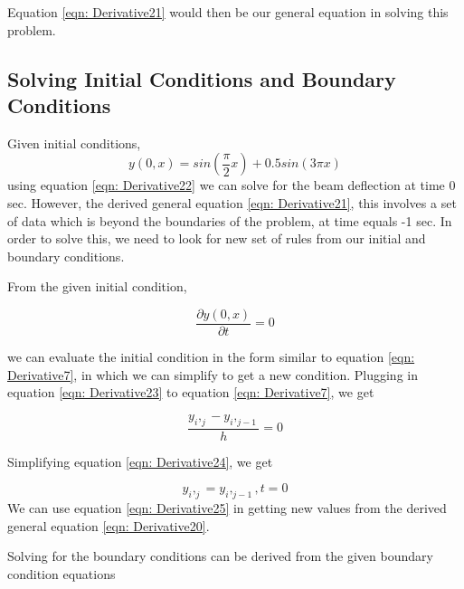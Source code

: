 \documentclass[conference]{IEEEtran}
\begin{document}
	Equation \eqref{eqn: Derivative21} would then be our general equation in solving this problem.
	
	\subsection{Solving Initial Conditions and Boundary Conditions}
	
	Given initial conditions,
	\begin{equation}
		\label{eqn: Derivative22}
		y(0,x)  = sin(\frac{\pi}{2} x) + 0.5 sin (3\pi x)
	\end{equation} 
	using equation \eqref{eqn: Derivative22} we can solve for the beam deflection at time 0 sec. However, the derived general equation \eqref{eqn: Derivative21}, this involves a set of data which is beyond the boundaries of the problem, at time equals -1 sec. In order to solve this, we need to look for new set of rules from our initial and boundary conditions.
	
	From the given initial condition, 
	
	\begin{equation}
		\label{eqn: Derivative23}
		\frac{\partial y(0,x)}{\partial t}  = 0
	\end{equation} 
	
	we can evaluate the initial condition in the form similar to equation \eqref{eqn: Derivative7}, in which we can simplify to get a new condition. Plugging in equation \eqref{eqn: Derivative23} to equation \eqref{eqn: Derivative7}, we get
	
	\begin{equation}
		\label{eqn: Derivative24}
		\frac{y_{i},_{j} - y_{i},_{j-1}}{h}  = 0
	\end{equation} 

	Simplifying equation \eqref{eqn: Derivative24}, we get 
	
	\begin{equation}
		\label{eqn: Derivative25}
		{y_{i},_{j} = y_{i},_{j-1}, t = 0}  
	\end{equation} 
	We can use equation \eqref{eqn: Derivative25} in getting new values from the derived general equation \eqref{eqn: Derivative20}.
	
	Solving for the boundary conditions can be derived from the given boundary condition equations
	
\end{document}

